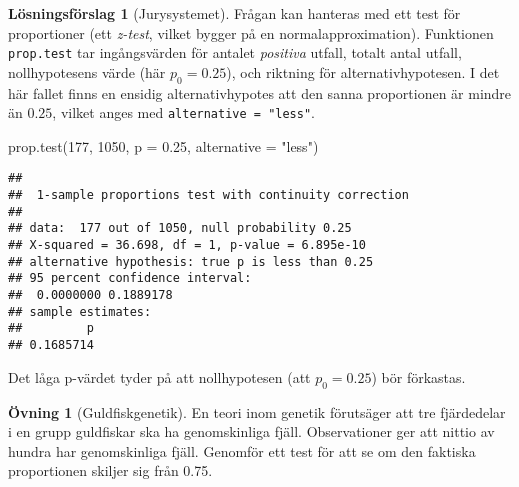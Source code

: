 \documentclass[
]{book}
\newenvironment{Shaded}{\begin{snugshade}}{\end{snugshade}}
\newcommand{\AttributeTok}[1]{\textcolor[rgb]{0.77,0.63,0.00}{#1}}
\newcommand{\DecValTok}[1]{\textcolor[rgb]{0.00,0.00,0.81}{#1}}
\newcommand{\FloatTok}[1]{\textcolor[rgb]{0.00,0.00,0.81}{#1}}
\newcommand{\FunctionTok}[1]{\textcolor[rgb]{0.00,0.00,0.00}{#1}}
\newcommand{\NormalTok}[1]{#1}
\newcommand{\StringTok}[1]{\textcolor[rgb]{0.31,0.60,0.02}{#1}}
\theoremstyle{definition}
\theoremstyle{definition}
\theoremstyle{definition}
\newtheorem{exercise}{Övning}[chapter]
\theoremstyle{definition}
\newtheorem{hypothesis}{Lösningsförslag}[chapter]
\theoremstyle{remark}
\begin{document}
\begin{hypothesis}[Jurysystemet]
Frågan kan hanteras med ett test för proportioner (ett \emph{z-test}, vilket bygger på en normalapproximation). Funktionen \texttt{prop.test} tar ingångsvärden för antalet \emph{positiva} utfall, totalt antal utfall, nollhypotesens värde (här \(p_0 = 0.25\)), och riktning för alternativhypotesen. I det här fallet finns en ensidig alternativhypotes att den sanna proportionen är mindre än \(0.25\), vilket anges med \texttt{alternative\ =\ "less"}.

\begin{Shaded}
\begin{Highlighting}[]
\FunctionTok{prop.test}\NormalTok{(}\DecValTok{177}\NormalTok{, }\DecValTok{1050}\NormalTok{, }\AttributeTok{p =} \FloatTok{0.25}\NormalTok{, }\AttributeTok{alternative =} \StringTok{"less"}\NormalTok{)}
\end{Highlighting}
\end{Shaded}

\begin{verbatim}
## 
##  1-sample proportions test with continuity correction
## 
## data:  177 out of 1050, null probability 0.25
## X-squared = 36.698, df = 1, p-value = 6.895e-10
## alternative hypothesis: true p is less than 0.25
## 95 percent confidence interval:
##  0.0000000 0.1889178
## sample estimates:
##         p 
## 0.1685714
\end{verbatim}

Det låga p-värdet tyder på att nollhypotesen (att \(p_0 = 0.25\)) bör förkastas.
\end{hypothesis}

\begin{exercise}[Guldfiskgenetik]
En teori inom genetik förutsäger att tre fjärdedelar i en grupp guldfiskar ska ha genomskinliga fjäll. Observationer ger att nittio av hundra har genomskinliga fjäll. Genomför ett test för att se om den faktiska proportionen skiljer sig från 0.75.
\end{exercise}
\end{document}
